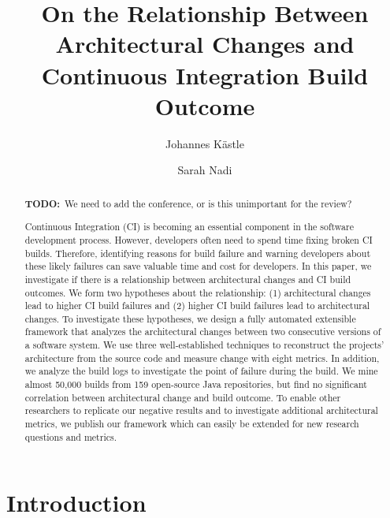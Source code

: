 \documentclass[sigplan, anonymous, review]{acmart}
\newcommand{\todo}[1]{{ \color{red} \textbf{TODO:}~#1}}
\begin{document}
\title[Architectural Change vs CI Build Outcome]{On the Relationship Between Architectural Changes and Continuous Integration Build Outcome
}

\author{Johannes K{\"a}stle}

\author{Sarah Nadi}

\begin{abstract}

\todo{We need to add the conference, or is this unimportant for the review?}

Continuous Integration (CI) is becoming an essential component in the software development process.
However, developers often need to spend time fixing broken CI builds.
Therefore, identifying reasons for build failure and warning developers about these likely failures can save valuable time and cost for developers.
In this paper, we investigate if there is a relationship between architectural changes and CI build outcomes.
We form two hypotheses about the relationship: (1) architectural changes lead to higher CI build failures and (2) higher CI build failures lead to architectural changes.
To investigate these hypotheses, we design a fully automated extensible framework that analyzes the architectural changes between two consecutive versions of a software system.
We use three well-established techniques to reconstruct the projects' architecture from the source code and measure change with eight metrics. 
In addition, we analyze the build logs to investigate the point of failure during the build. 
We mine almost 50,000 builds from 159 open-source Java repositories, but find no significant correlation between architectural change and build outcome. 
To enable other researchers to replicate our negative results and to investigate additional architectural metrics, we publish our framework which can easily be extended for new research questions and metrics.
\end{abstract}

\maketitle

\section{Introduction}
\end{document}
